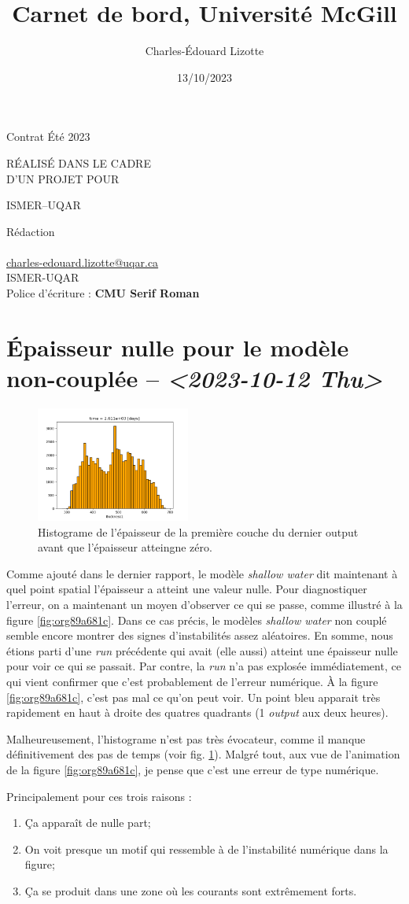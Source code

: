 \documentclass[10pt]{article}
\author{Charles-Édouard Lizotte}
\date{13/10/2023}
\title{Carnet de bord, Université McGill}
\makeatletter
\numberwithin{equation}{section}
\newcommand{\mytitlepage}{
\begin{titlepage}
\begin{center}
{\Huge \thesubtitle \par}
\vspace{2cm}
{\Huge \MakeUppercase{\thetitle} \par}
\vspace{2cm}
RÉALISÉ DANS LE CADRE\\ D'UN PROJET POUR \par
\vspace{2cm}
{\Huge ISMER--UQAR \par}
\vspace{2cm}
{\thedate}
\end{center}
\vfill
Rédaction \\
{\theauthor}\\
\url{charles-edouard.lizotte@uqar.ca}\\
ISMER-UQAR\\
Police d'écriture : \textbf{CMU Serif Roman}
\end{titlepage}
}
\newcommand{\thesubtitle}{Contrat Été 2023}
\makeatother
\begin{document}
\mytitlepage
\tableofcontents\newpage

\section{Épaisseur nulle pour le modèle non-couplée -- \textit{<2023-10-12 Thu>}}
\label{sec:orga8e9fd5}

\begin{figure}\vspace{-\baselineskip} \centering
\centering
\includegraphics[width=0.45\textwidth]{figures/debuggage/2023_10_08_thickness1_histo.png}
\caption{\label{fig:orge3bbad2}Histograme de l'épaisseur de la première couche du dernier output avant que l'épaisseur atteingne zéro.}
\end{figure}


Comme ajouté dans le dernier rapport, le modèle \emph{shallow water} dit maintenant à quel point spatial l'épaisseur a atteint une valeur nulle.
Pour diagnostiquer l'erreur, on a maintenant un moyen d'observer ce qui se passe, comme illustré à la figure \ref{fig:org89a681c}.
Dans ce cas précis, le modèles \emph{shallow water} non couplé semble encore montrer des signes d'instabilités assez aléatoires.
En somme, nous étions parti d'une \emph{run} précédente qui avait (elle aussi) atteint une épaisseur nulle pour voir ce qui se passait.
Par contre, la \emph{run} n'a pas explosée immédiatement, ce qui vient confirmer que c'est probablement de l'erreur numérique.
À la figure \ref{fig:org89a681c}, c'est pas mal ce qu'on peut voir.
Un point bleu apparait très rapidement en haut à droite des quatres quadrants (1 \emph{output} aux deux heures). \bigskip

Malheureusement, l'histograme n'est pas très évocateur, comme il manque définitivement des pas de temps (voir fig. \ref{fig:orge3bbad2}).
Malgré tout, aux vue de l'animation de la figure \ref{fig:org89a681c}, je pense que c'est une erreur de type numérique.\bigskip

Principalement pour ces trois raisons : 
\begin{enumerate}
\item Ça apparaît de nulle part;
\item On voit presque un motif qui ressemble à de l'instabilité numérique dans la figure;
\item Ça se produit dans une zone où les courants sont extrêmement forts.
\end{enumerate}
\end{document}
